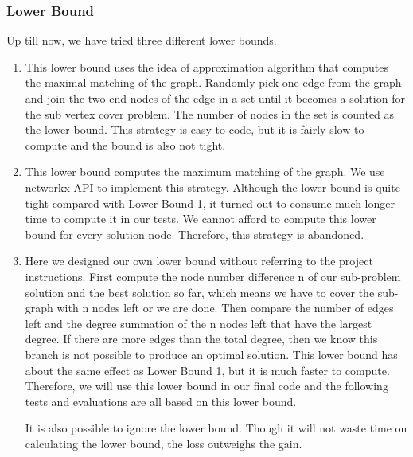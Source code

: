 \subsubsection{Lower Bound}
Up till now, we have tried three different lower bounds.
\begin{enumerate}
\item This lower bound uses the idea of approximation algorithm that computes the maximal matching of the graph. Randomly pick one edge from the graph and join the two end nodes of the edge in a set until it becomes a solution for the sub vertex cover problem. The number of nodes in the set is counted as the lower bound. This strategy is easy to code, but it is fairly slow to compute and the bound is also not tight.
\item This lower bound computes the maximum matching of the graph. We use networkx API to implement this strategy. Although the lower bound is quite tight compared with Lower Bound 1, it turned out to consume much longer time to compute it in our tests. We cannot afford to compute this lower bound for every solution node. Therefore, this strategy is abandoned.
\item Here we designed our own lower bound without referring to the project instructions. First compute the node number difference n of our sub-problem solution and the best solution so far, which means we have to cover the sub-graph with n nodes left or we are done. Then compare the number of edges left and the degree summation of the n nodes left that have the largest degree. If there are more edges than the total degree, then we know this branch is not possible to produce an optimal solution. This lower bound has about the same effect as Lower Bound 1, but it is much faster to compute. Therefore, we will use this lower bound in our final code and the following tests and evaluations are all based on this lower bound.

It is also possible to ignore the lower bound. Though it will not waste time on calculating the lower bound, the loss outweighs the gain.
\end{enumerate}
